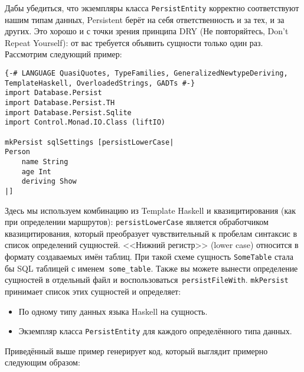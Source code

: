 Дабы убедиться, что экземпляры класса \lstinline'PersistEntity' корректно
соответствуют нашим типам данных, Persistent берёт на себя ответственность и за
тех, и за других. Это хорошо и с точки зрения принципа DRY (Не повторяйтесь,
Don't Repeat Yourself): от вас требуется объявить сущности только один раз.
Рассмотрим следующий пример:

\begin{lstlisting}
{-# LANGUAGE QuasiQuotes, TypeFamilies, GeneralizedNewtypeDeriving, TemplateHaskell, OverloadedStrings, GADTs #-}
import Database.Persist
import Database.Persist.TH
import Database.Persist.Sqlite
import Control.Monad.IO.Class (liftIO)

mkPersist sqlSettings [persistLowerCase|
Person
    name String
    age Int
    deriving Show
|]
\end{lstlisting}

Здесь мы используем комбинацию из Template Haskell и квазицитирования (как при
определении маршрутов): \lstinline'persistLowerCase' является обработчиком
квазицитирования, который преобразует чувствительный к пробелам синтаксис в
список определений сущностей. <<Нижний регистр>> (lower case) относится в
формату создаваемых имён таблиц. При такой схеме сущность \lstinline'SomeTable'
стала бы SQL таблицей с именем~\texttt{some\_table}. Также вы можете вынести
определение сущностей в отдельный файл и
воспользоваться~\lstinline'persistFileWith'. \lstinline'mkPersist' принимает
список этих сущностей и определяет:

\begin{itemize}
  \item По одному типу данных языка Haskell на сущность.

  \item Экземпляр класса \lstinline'PersistEntity' для каждого определённого
      типа данных.
\end{itemize}

Приведённый выше пример генерирует код, который выглядит примерно следующим
образом:

